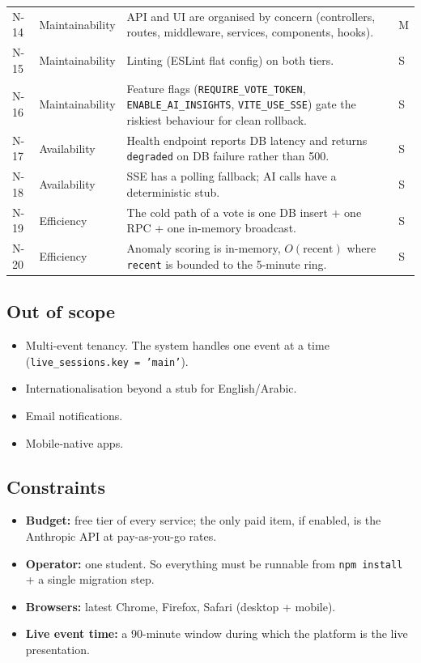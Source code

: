 \begin{longtable}{p{}p{}p{}p{}}
  N-14 & Maintainability & API and UI are organised by concern (controllers, routes, middleware, services, components, hooks). & M \\
  N-15 & Maintainability & Linting (ESLint flat config) on both tiers. & S \\
  N-16 & Maintainability & Feature flags (\texttt{REQUIRE\_VOTE\_TOKEN}, \texttt{ENABLE\_AI\_INSIGHTS}, \texttt{VITE\_USE\_SSE}) gate the riskiest behaviour for clean rollback. & S \\
  N-17 & Availability  & Health endpoint reports DB latency and returns \texttt{degraded} on DB failure rather than 500. & S \\
  N-18 & Availability  & SSE has a polling fallback; AI calls have a deterministic stub. & S \\
  N-19 & Efficiency    & The cold path of a vote is one DB insert + one RPC + one in-memory broadcast. & S \\
  N-20 & Efficiency    & Anomaly scoring is in-memory, $O(\text{recent})$ where \texttt{recent} is bounded to the 5-minute ring. & S \\

  \bottomrule
\end{longtable}

\subsection{Out of scope}

\begin{itemize}[leftmargin=*]
  \item Multi-event tenancy. The system handles one event at a time
        (\texttt{live\_sessions.key = 'main'}).
  \item Internationalisation beyond a stub for English/Arabic.
  \item Email notifications.
  \item Mobile-native apps.
\end{itemize}

\subsection{Constraints}

\begin{itemize}[leftmargin=*]
  \item \textbf{Budget:} free tier of every service; the only paid item, if
        enabled, is the Anthropic API at pay-as-you-go rates.
  \item \textbf{Operator:} one student. So everything must be runnable from
        \texttt{npm install} + a single migration step.
  \item \textbf{Browsers:} latest Chrome, Firefox, Safari (desktop + mobile).
  \item \textbf{Live event time:} a 90-minute window during which the
        platform is the live presentation.
\end{itemize}
